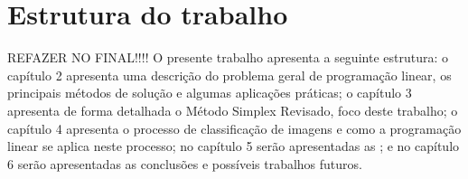 \section{Estrutura do trabalho}
REFAZER NO FINAL!!!!
O presente trabalho apresenta a seguinte estrutura: o capítulo 2 apresenta uma descrição do problema geral de programação linear, os principais métodos de solução e algumas aplicações práticas; o capítulo 3 apresenta de forma detalhada o Método Simplex Revisado, foco deste trabalho; o capítulo 4 apresenta o processo de classificação de imagens e como a programação linear se aplica neste processo; no capítulo 5 serão apresentadas as ; e no capítulo 6 serão apresentadas as conclusões e possíveis trabalhos futuros. 
